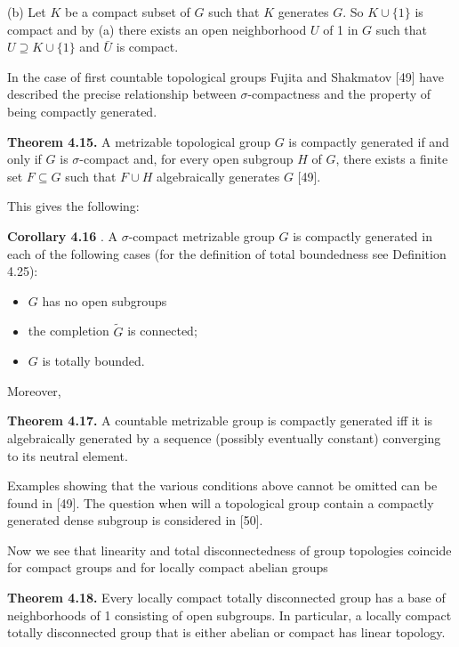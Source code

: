 \documentclass[12pt]{article}
\begin{document}
    (b) Let $K$ be a compact subset of $G$ such that $K$ generates $G$. So $K \cup \{1\}$ is compact and by (a) there exists
an open neighborhood $U$ of 1 in $G$ such that $U \supseteq K \cup \{1\}$ and $\bar{U}$ is compact.


    In the case of first countable topological groups Fujita and Shakmatov [49] have described the precise
relationship between $\sigma$-compactness and the property of being compactly generated.


\textbf{Theorem 4.15.} A metrizable topological group $G$ is compactly generated if and only if $G$ is $\sigma$-compact and, for
every open subgroup $H$ of $G$, there exists a finite set $F \subseteq G$ such that $F \cup H$ algebraically generates $G$ [49].


    This gives the following:


\textbf{Corollary 4.16} . A $\sigma$-compact metrizable group $G$ is compactly generated in each of the following cases (for the
definition of total boundedness see Definition 4.25):


\begin{itemize}

    \item $G$ has no open subgroups

    \item the completion $\tilde{G}$ is connected;

    \item $G$ is totally bounded.

\end{itemize}


    Moreover,


\textbf{Theorem 4.17.} A countable metrizable group is compactly generated iff it is algebraically generated by a
sequence (possibly eventually constant) converging to its neutral element.


    Examples showing that the various conditions above cannot be omitted can be found in [49].
The question when will a topological group contain a compactly generated dense subgroup is considered in
[50].


    Now we see that linearity and total disconnectedness of group topologies coincide for compact groups and
for locally compact abelian groups


\textbf{Theorem 4.18.} Every locally compact totally disconnected group has a base of neighborhoods of 1 consisting
of open subgroups. In particular, a locally compact totally disconnected group that is either abelian or compact
has linear topology.
\end{document}
